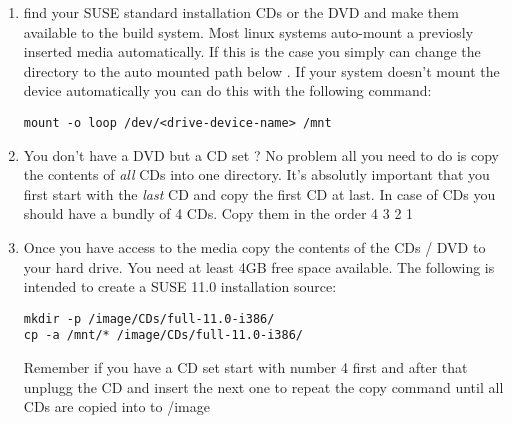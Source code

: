 \begin{enumerate}
\item find your SUSE standard installation CDs or the DVD and
      make them available to the build system. Most linux systems
      auto-mount a previosly inserted media automatically. If this
      is the case you simply can change the directory to the
      auto mounted path below . If your system doesn't mount
      the device automatically you can do this with the following
      command:

\begin{Command}{12cm}
\begin{verbatim}
mount -o loop /dev/<drive-device-name> /mnt
\end{verbatim}
\end{Command}

\item You don't have a DVD but a CD set ? No problem all you need to
      do is copy the contents of \emph{all} CDs into one directory. It's
      absolutly important that you first start with the \emph{last} CD and
      copy the first CD at last. In case of CDs you should have a
      bundly of 4 CDs. Copy them in the order 4 3 2 1

\item Once you have access to the media copy the contents of the
      CDs / DVD to your hard drive. You need at least 4GB free
      space available. The following is intended to create a SUSE
      11.0 installation source:

\begin{Command}{12cm}
\begin{verbatim}
mkdir -p /image/CDs/full-11.0-i386/
cp -a /mnt/* /image/CDs/full-11.0-i386/
\end{verbatim}
\end{Command}

      Remember if you have a CD set start with number 4 first and
      after that unplugg the CD and insert the next one to repeat
      the copy command until all CDs are copied into to /image
\end{enumerate}
